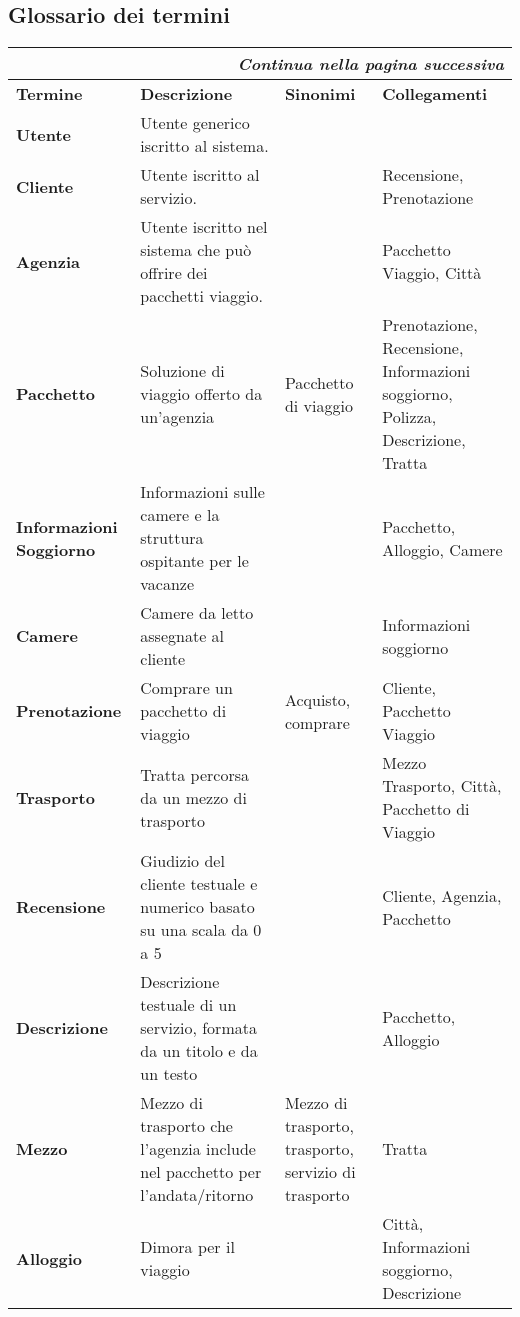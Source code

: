 \subsection{Glossario dei termini}
\begin{center}
    \begin{tabularx}{\textwidth}{p{} X >{\raggedright\arraybackslash}p{} >{\raggedright\arraybackslash}p{}}
        \caption{Dizionario termini}\\\toprule\endfirsthead
        \toprule\endhead
        \midrule\multicolumn{4}{r}{\itshape Continua nella pagina successiva}\\\midrule\endfoot
        \bottomrule\endlastfoot
        \textbf{Termine} & \textbf{Descrizione} & \textbf{Sinonimi} & \textbf{Collegamenti} \\
        \midrule
        \textbf{Utente} & Utente generico iscritto al sistema. & &
        \\\midrule
        \textbf{Cliente} & Utente iscritto al servizio. & & Recensione, Prenotazione
        \\\midrule
        \textbf{Agenzia} & Utente iscritto nel sistema che può offrire dei pacchetti viaggio. & & Pacchetto Viaggio, Città
        \\\midrule
        \textbf{Pacchetto} & Soluzione di viaggio offerto da un'agenzia & Pacchetto di viaggio & Prenotazione, Recensione, Informazioni soggiorno, Polizza, Descrizione, Tratta
        \\\midrule
        \textbf{Informazioni Soggiorno} & Informazioni sulle camere e la struttura ospitante per le vacanze & & Pacchetto, Alloggio, Camere
        \\\midrule
        \textbf{Camere} & Camere da letto assegnate al cliente & & Informazioni soggiorno
        \\\midrule
        \textbf{Prenotazione} & Comprare un pacchetto di viaggio & Acquisto, comprare & Cliente, Pacchetto Viaggio
        \\\midrule
        \textbf{Trasporto} & Tratta percorsa da un mezzo di trasporto & & Mezzo Trasporto, Città, Pacchetto di Viaggio
        \\\midrule
        \textbf{Recensione} & Giudizio del cliente testuale e numerico basato su una scala da 0 a 5 & & Cliente, Agenzia, Pacchetto 
        \\\midrule
        \textbf{Descrizione} & Descrizione testuale di un servizio, formata da un titolo e da un testo & & Pacchetto, Alloggio
        \\\midrule
        \textbf{Mezzo} & Mezzo di trasporto che l'agenzia include nel pacchetto per l'andata/ritorno & Mezzo di trasporto, trasporto, servizio di trasporto & Tratta
        \\\midrule
        \textbf{Alloggio} & Dimora per il viaggio & & Città, Informazioni soggiorno, Descrizione
        \\
    \end{tabularx}
\end{center}

